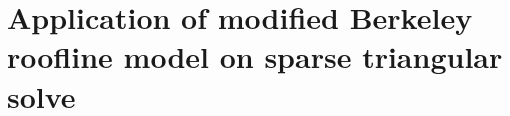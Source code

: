 \section[Application of modified Berkeley roofline model]{Application of modified Berkeley roofline model on sparse triangular solve}
\label{sec:mrm}


